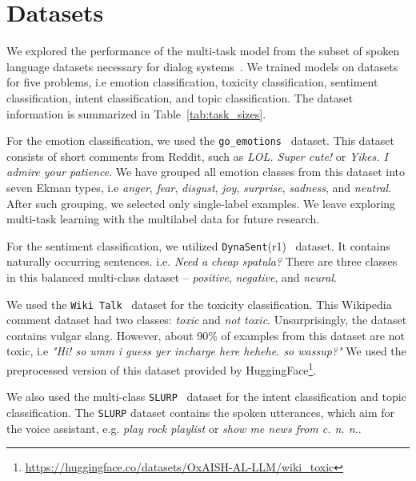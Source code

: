 \section{Datasets}

We explored the performance of the multi-task model from the subset of spoken language datasets necessary for dialog systems~\cite{wochat, lrec}. We trained models on datasets for five problems, i.e emotion classification, toxicity classification, sentiment classification, intent classification, and topic classification. The dataset information is summarized in Table~\ref{tab:task_sizes}.

For the emotion classification, we used the \texttt{go\_emotions}~\cite{emotions} dataset. This dataset consists of short comments from Reddit, such as \textit{LOL. Super cute!} or \textit{Yikes. I admire your patience}. We have grouped all emotion classes from this dataset into seven Ekman types, i.e \textit{anger}, \textit{fear}, \textit{disgust}, \textit{joy}, \textit{surprise}, \textit{sadness}, and \textit{neutral}. After such grouping, we selected only single-label examples. We leave exploring multi-task learning with the multilabel data for future research.

For the sentiment classification, we utilized \texttt{DynaSent}(r1)~\cite{sentiment} dataset. It contains naturally occurring sentences. i.e. \textit{Need a cheap spatula?} There are three classes in this balanced multi-class dataset -- \textit{positive},  \textit{negative}, and \textit{neural}. %

We used the \texttt{Wiki Talk}~\cite{toxic} dataset for the toxicity classification. This Wikipedia comment dataset had two classes: \textit{toxic} and \textit{not toxic}. Unsurprisingly, the dataset contains vulgar slang. However, about 90\% of examples from this dataset are not toxic, i.e \textit{"Hi! so umm i guess yer incharge here hehehe. so wassup?"} We used the preprocessed version of this dataset provided by HuggingFace\footnote{\url{https://huggingface.co/datasets/OxAISH-AL-LLM/wiki_toxic}}.


We also used the multi-class \texttt{SLURP}~\cite{slurp} dataset for the intent classification and topic classification. The \texttt{SLURP} dataset contains the spoken utterances, which aim for the voice assistant, e.g. \textit{play rock playlist} or \textit{show me news from c. n. n.}.

